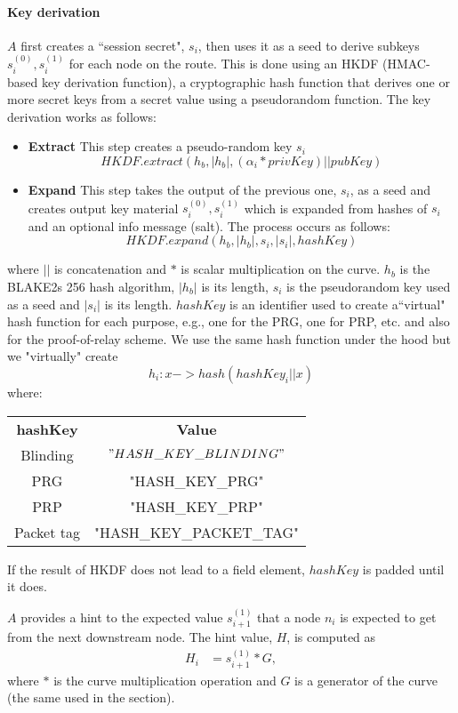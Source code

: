 \paragraph{Key derivation}
$A$ first creates a ``session secret", $s_i$, then uses it as a seed to derive subkeys $s_i^{(0)},s_i^{(1)}$ for each node on the route. This is done using an HKDF (HMAC-based key derivation function), a cryptographic hash function that derives one or more secret keys from a secret value using a pseudorandom function. The key derivation works as follows:
\begin{itemize}
    \item \textbf{Extract} This step creates a pseudo-random key $s_i$   
    $$HKDF.extract(h_b, |h_b|, (\alpha_i* privKey) || pubKey)$$   

    \item \textbf{Expand} This step takes the output of the previous one, $s_i$, as a seed and creates output key material $s_i^{(0)},s_i^{(1)}$ which is expanded from hashes of $s_i$ and an optional info message (salt). The process occurs as follows:
    $$HKDF.expand(h_b, |h_b|,s_i, |s_i|, hashKey)$$
\end{itemize}
where $||$ is concatenation and $*$ is scalar multiplication on the curve. $h_b$ is the BLAKE2s 256 hash algorithm, $|h_b|$ is its length, $s_i$ is the pseudorandom key used as a seed and $|s_i|$ is its length. $hashKey$ is an identifier used to create a``virtual" hash function for each purpose, e.g., one for the PRG, one for PRP, etc. and also for the proof-of-relay scheme. We use the same hash function under the hood but we "virtually" create 
$$h_i: x -> hash(hashKey_i || x)$$ where: 
\begin{center}
\begin{tabular}{c|c|} 
      \textbf{hashKey} & \textbf{Value}\\
       Blinding& $"HASH\_KEY\_BLINDING"$ \\
      \hline
      PRG & "HASH\_KEY\_PRG" \\
      PRP & "HASH\_KEY\_PRP" \\
      Packet tag & "HASH\_KEY\_PACKET\_TAG" \\
    \end{tabular}
\end{center}
    
If the result of HKDF does not lead to a field element, $hashKey$ is padded until it does. 
    
$A$ provides a hint to the expected value $s_{i+1}^{(1)}$ that a node $n_i$ is expected to get from the next downstream node.
The hint value, $H$, is computed as 
\begin{align}  
    H_i&=s_{i+1}^{(1)}*G,
        \end{align}
where $*$ is the curve multiplication operation and $G$ is a generator of the curve (the same used in the  section). 
    
